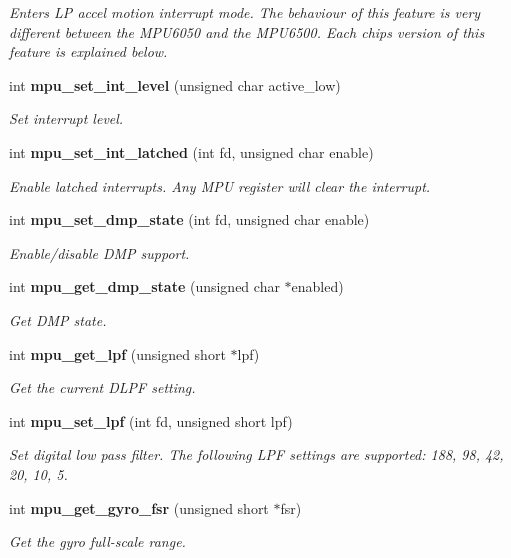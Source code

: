 \begin{DoxyCompactItemize}
\begin{DoxyCompactList}\small\item\em Enters LP accel motion interrupt mode. The behaviour of this feature is very different between the M\+P\+U6050 and the M\+P\+U6500. Each chip\textquotesingle{}s version of this feature is explained below. \end{DoxyCompactList}\item 
int \textbf{ mpu\+\_\+set\+\_\+int\+\_\+level} (unsigned char active\+\_\+low)
\begin{DoxyCompactList}\small\item\em Set interrupt level. \end{DoxyCompactList}\item 
int \textbf{ mpu\+\_\+set\+\_\+int\+\_\+latched} (int fd, unsigned char enable)
\begin{DoxyCompactList}\small\item\em Enable latched interrupts. Any M\+PU register will clear the interrupt. \end{DoxyCompactList}\item 
int \textbf{ mpu\+\_\+set\+\_\+dmp\+\_\+state} (int fd, unsigned char enable)
\begin{DoxyCompactList}\small\item\em Enable/disable D\+MP support. \end{DoxyCompactList}\item 
int \textbf{ mpu\+\_\+get\+\_\+dmp\+\_\+state} (unsigned char $\ast$enabled)
\begin{DoxyCompactList}\small\item\em Get D\+MP state. \end{DoxyCompactList}\item 
int \textbf{ mpu\+\_\+get\+\_\+lpf} (unsigned short $\ast$lpf)
\begin{DoxyCompactList}\small\item\em Get the current D\+L\+PF setting. \end{DoxyCompactList}\item 
int \textbf{ mpu\+\_\+set\+\_\+lpf} (int fd, unsigned short lpf)
\begin{DoxyCompactList}\small\item\em Set digital low pass filter. The following L\+PF settings are supported\+: 188, 98, 42, 20, 10, 5. \end{DoxyCompactList}\item 
int \textbf{ mpu\+\_\+get\+\_\+gyro\+\_\+fsr} (unsigned short $\ast$fsr)
\begin{DoxyCompactList}\small\item\em Get the gyro full-\/scale range. \end{DoxyCompactList}\item 

\end{DoxyCompactItemize}
